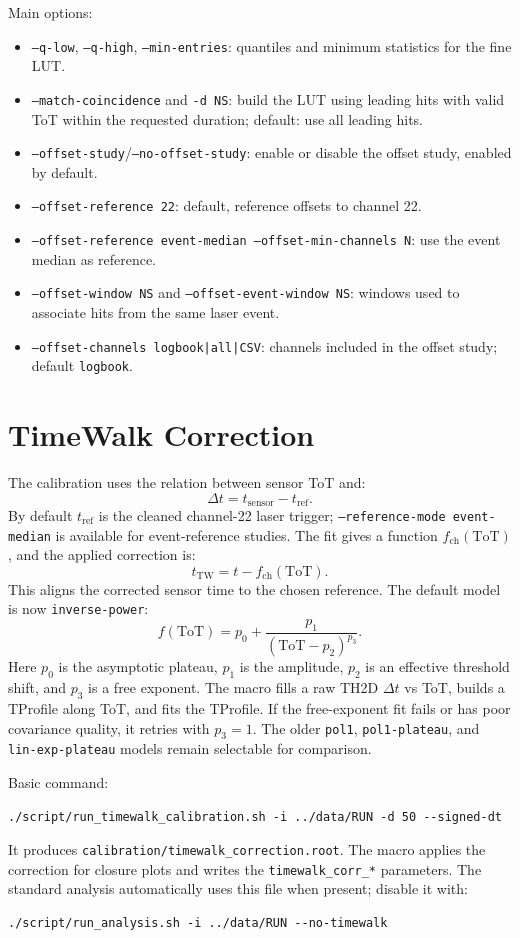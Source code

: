 \documentclass[10pt]{article}
\begin{document}
Main options:
\begin{itemize}
  \item \texttt{--q-low}, \texttt{--q-high}, \texttt{--min-entries}: quantiles and minimum statistics for the fine LUT.
  \item \texttt{--match-coincidence} and \texttt{-d NS}: build the LUT using leading hits with valid ToT within the requested duration; default: use all leading hits.
  \item \texttt{--offset-study}/\texttt{--no-offset-study}: enable or disable the offset study, enabled by default.
  \item \texttt{--offset-reference 22}: default, reference offsets to channel 22.
  \item \texttt{--offset-reference event-median --offset-min-channels N}: use the event median as reference.
  \item \texttt{--offset-window NS} and \texttt{--offset-event-window NS}: windows used to associate hits from the same laser event.
  \item \texttt{--offset-channels logbook|all|CSV}: channels included in the offset study; default \texttt{logbook}.
\end{itemize}

\section*{TimeWalk Correction}
The calibration uses the relation between sensor ToT and:
\[
  \Delta t = t_\mathrm{sensor} - t_\mathrm{ref}.
\]
By default \(t_\mathrm{ref}\) is the cleaned channel-22 laser trigger; \texttt{--reference-mode event-median} is available for event-reference studies. The fit gives a function \(f_\mathrm{ch}(\mathrm{ToT})\), and the applied correction is:
\[
  t_\mathrm{TW} = t - f_\mathrm{ch}(\mathrm{ToT}).
\]
This aligns the corrected sensor time to the chosen reference. The default model is now \texttt{inverse-power}:
\[
  f(\mathrm{ToT}) = p_0 + \frac{p_1}{(\mathrm{ToT}-p_2)^{p_3}} .
\]
Here \(p_0\) is the asymptotic plateau, \(p_1\) is the amplitude, \(p_2\) is an effective threshold shift, and \(p_3\) is a free exponent. The macro fills a raw TH2D \(\Delta t\) vs ToT, builds a TProfile along ToT, and fits the TProfile. If the free-exponent fit fails or has poor covariance quality, it retries with \(p_3=1\). The older \texttt{pol1}, \texttt{pol1-plateau}, and \texttt{lin-exp-plateau} models remain selectable for comparison.

Basic command:
\begin{verbatim}
./script/run_timewalk_calibration.sh -i ../data/RUN -d 50 --signed-dt
\end{verbatim}
It produces \texttt{calibration/timewalk\_correction.root}. The macro applies the correction for closure plots and writes the \texttt{timewalk\_corr\_*} parameters. The standard analysis automatically uses this file when present; disable it with:
\begin{verbatim}
./script/run_analysis.sh -i ../data/RUN --no-timewalk
\end{verbatim}
\end{document}

